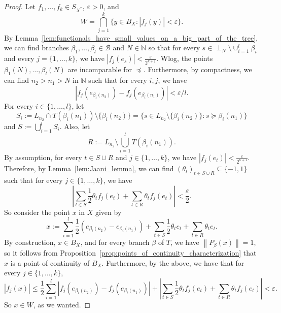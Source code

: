 \documentclass[11pt,a4paper,reqno]{amsart}
\numberwithin{equation}{section}
\newcommand{\abs}[1]{\left\lvert#1\right\rvert}
\newcommand{\norm}[1]{\left\lVert#1\right\rVert}
\newcommand{\N}{\mathbb{N}}
\newcommand{\B}{\mathcal{B}}
\newcommand{\eps}{\varepsilon}
\newcommand{\1}{\mathbbm{1}}
\renewcommand{\leq}{\leqslant}
\theoremstyle{plain}
\theoremstyle{definition}
\begin{document}
\begin{proof}
    Let $f_1,\dots,f_k\in S_{X^*}$, $\varepsilon>0$, and
    \begin{equation*}
        W =\bigcap_{j=1}^k\{ y\in B_X\colon |f_j(y)|<\varepsilon\}.
    \end{equation*}
By Lemma~\ref{lem:functionals_have_small_values_on_a_big_part_of_the_tree}, we can find branches $\beta_1,\dots,\beta_l\in\B$ and $N\in\N$ so that for every $s\in\perp_{N}\setminus\cup_{i=1}^l\beta_i$ and every $j=\{1,\dots,k\}$, we have $|f_j(e_s)|<\frac{\eps}{2^{k+1}}$. Wlog, the points $\beta_1(N),\dots,\beta_l(N)$ are incomparable for $\preceq$. Furthermore, by compactness, we can find $n_2>n_1>N$ in $\N$ such that for every $i,j$, we have \begin{equation*}
    \abs{f_j(e_{\beta_i(n_2)})-f_j(e_{\beta_i(n_1)})}<\varepsilon/l.
\end{equation*} For every $i\in\{1,\dots,l\}$, let \begin{equation*}
    S_i:=L_{n_2}\cap T(\beta_i(n_1))\setminus\{\beta_i(n_2)\}=\{s\in L_{n_2}\setminus\{\beta_i(n_2)\}\colon s\succeq \beta_i(n_1)\} 
\end{equation*} and $S:=\bigcup_{i=1}^lS_i$. Also, let \begin{equation*}
    R:=L_{n_2}\setminus\bigcup_{i=1}^lT(\beta_i(n_1)).
\end{equation*} By assumption, for every $t\in S\cup R$ and $j\in\{1,\dots,k\}$, we have $\abs{f_j(e_t)}<\frac{\eps}{2^{k+1}}$. Therefore, by Lemma~\ref{lem:Jaani_lemma}, we can find $(\theta_t)_{t\in S\cup R}\subseteq\{-1,1\}$ such that for every $j\in\{1,\dots,k\}$, we have \begin{equation*}
    \abs{\sum_{t\in S}\frac{1}{2}\theta_tf_j(e_t)+\sum_{t\in R}\theta_t f_j(e_t)}<\frac{\eps}{2}.
\end{equation*} So consider the point $x$ in $X$ given by \begin{equation*}
    x:=\sum_{i=1}^l\frac{1}{2}(e_{\beta_i(n_2)}-e_{\beta_i(n_1)})+\sum_{t\in S}\frac{1}{2}\theta_te_t+\sum_{t\in R}\theta_t e_t.
\end{equation*} By construction, $x\in B_X$, and for every branch $\beta$ of $T$, we have $\norm{P_\beta(x)}=1$, so it follows from Proposition~\ref{prop:points_of_continuity_characterization} that $x$ is a point of continuity of $B_X$. Furthermore, by the above, we have that for every $j\in \{1,\dots,k\}$, \begin{equation*}
    \abs{f_j(x)}\leq\frac{1}{2}\sum_{i=1}^l\abs{f_j(e_{\beta_i(n_2)})-f_j(e_{\beta_i(n_1)})}+\abs{\sum_{t\in S}\frac{1}{2}\theta_tf_j(e_t)+\sum_{t\in R}\theta_t f_j(e_t)}<\eps.
\end{equation*} So $x\in W$, as we wanted. 
\end{proof}
\end{document}
